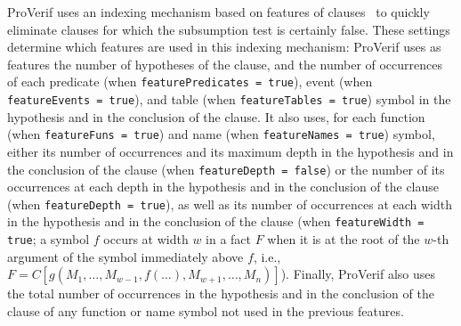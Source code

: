 \documentclass{book}
\begin{document}
\begin{itemize}
ProVerif uses an indexing
mechanism based on features of clauses~\cite{Schulz13} to quickly
eliminate clauses for which the subsumption test is certainly
false. These settings determine which features are used in
this indexing mechanism:
ProVerif uses as features the number of hypotheses of the clause,
and the number of occurrences of each predicate (when \lstinline{featurePredicates = true}),
event (when \lstinline{featureEvents = true}),
and table (when \lstinline{featureTables = true}) symbol
in the hypothesis and in the conclusion of the clause.
It also uses, for each function (when \lstinline{featureFuns = true}) and
name (when \lstinline{featureNames = true}) symbol, either its number of
occurrences and its maximum depth in the hypothesis and in the conclusion
of the clause (when \lstinline{featureDepth = false}) or the number of its
occurrences at each depth in the hypothesis and in the conclusion of
the clause (when \lstinline{featureDepth = true}), as well as
its number of occurrences at each width in the hypothesis and in the conclusion of
the clause (when \lstinline{featureWidth = true}; a symbol $f$ occurs at width
$w$ in a fact $F$ when it is at the root of the $w$-th argument of the symbol immediately
above $f$, i.e., $F = C[g(M_1, \allowbreak \dots, \allowbreak M_{w-1}, \allowbreak f(\dots), \allowbreak M_{w+1}, \allowbreak \dots, \allowbreak M_n)]$).
Finally, ProVerif also uses the total number of occurrences in the hypothesis and
in the conclusion of the clause of any function or name symbol not used
in the previous features.



\end{itemize}
\end{document}
